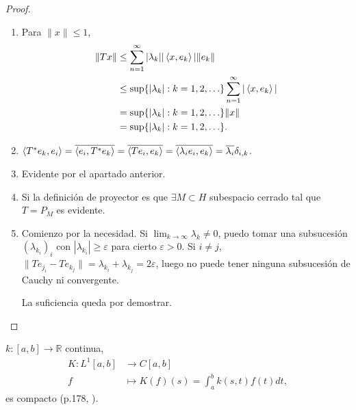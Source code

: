 \begin{proof}\hfill
  \begin{enumerate}
    \item Para $\|x\|\le 1$, 
      \begin{align*}
        \|Tx\| & \le \sum_{n=1}^{\infty} |\lambda_k| |\left\langle x,e_k\right\rangle| \|e_k\| \\
               & \le \sup \{|\lambda_k|:k=1,2,\ldots\} \sum_{n=1}^{\infty} |\left\langle x,e_k\right\rangle| \\
               & = \sup \{|\lambda_k|:k=1,2,\ldots\} \|x\| \\
               & = \sup \{|\lambda_k|:k=1,2,\ldots\}
      .\end{align*}
    \item $\left\langle T^*e_k,e_i\right\rangle= \overline{\left\langle e_i,T^*e_k\right\rangle}=
      \overline{\left\langle Te_i,e_k\right\rangle}= \overline{\left\langle\lambda_i
      e_i,e_k\right\rangle}=\overline{\lambda_i} \delta_{i,k}$.

    \item Evidente por el apartado anterior.
    \item Si la definición de proyector es que $\exists M\subset H$ subespacio
      cerrado tal que $T=P_M$ es evidente.
    \item Comienzo por la necesidad. Si $\lim_{k \to \infty} \lambda_k \neq 0$,
      puedo tomar una subsucesión $(\lambda_{k_i})_i$ con $|\lambda_{k_i}|\ge
      \varepsilon$ para cierto $\varepsilon>0$. Si $i\neq j$,
      $\|Te_{j_i}-Te_{k_j}\|=\lambda_{k_i}+\lambda_{k_j}=2\varepsilon$, luego no
      puede tener ninguna subsucesión de Cauchy ni convergente.

      La suficiencia queda por demostrar.
  \end{enumerate}
\end{proof}


\begin{example}
  $k:[a,b]\to \mathbb{R}$ continua,
  \begin{align*}
    K: L^1[a,b] &\longrightarrow C[a,b] \\
    f &\longmapsto K(f)(s) = \int_{a}^{b} k(s,t)f(t)dt 
  ,\end{align*}
  es compacto (p.178, \cite{cascales2012}).
\end{example}

